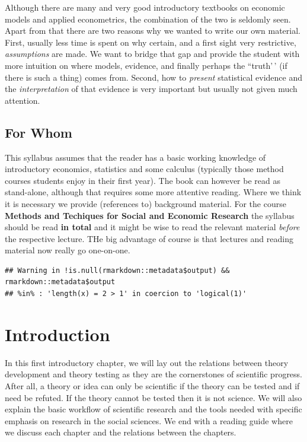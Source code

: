 \documentclass[
]{book}
\begin{document}
Although there are many and very good introductory textbooks on economic models and applied econometrics, the combination of the two is seldomly seen. Apart from that there are two reasons why we wanted to write our own material. First, usually less time is spent on why certain, and a first sight very restrictive, \emph{assumptions} are made. We want to bridge that gap and provide the student with more intuition on where models, evidence, and finally perhaps the ``truth'\,' (if there is such a thing) comes from. Second, how to \emph{present} statistical evidence and the \emph{interpretation} of that evidence is very important but usually not given much attention.

\hypertarget{for-whom}{%
\section*{For Whom}\label{for-whom}}

This syllabus assumes that the reader has a basic working knowledge of introductory economics, statistics and some calculus (typically those method courses students enjoy in their first year). The book can however be read as stand-alone, although that requires some more attentive reading. Where we think it is necessary we provide (references to) background material. For the course \textbf{Methods and Techiques for Social and Economic Research} the syllabus should be read \textbf{in total} and it might be wise to read the relevant material \emph{before} the respective lecture. THe big advantage of course is that lectures and reading material now really go one-on-one.

\begin{verbatim}
## Warning in !is.null(rmarkdown::metadata$output) && rmarkdown::metadata$output
## %in% : 'length(x) = 2 > 1' in coercion to 'logical(1)'
\end{verbatim}

\hypertarget{introduction}{%
\chapter{Introduction}\label{introduction}}

In this first introductory chapter, we will lay out the relations between theory development and theory testing as they are the cornerstones of scientific progress. After all, a theory or idea can only be scientific if the theory can be tested and if need be refuted. If the theory cannot be tested then it is not science. We will also explain the basic workflow of scientific research and the tools needed with specific emphasis on research in the social sciences. We end with a reading guide where we discuss each chapter and the relations between the chapters.
\end{document}
